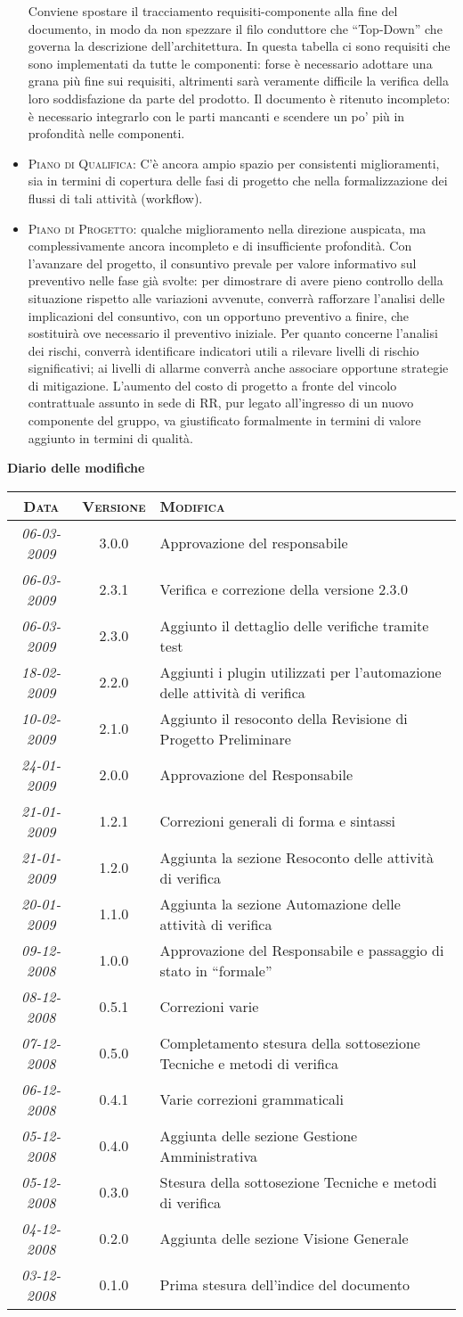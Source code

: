 \documentclass[11pt,a4paper]{article}
\newcommand{\modifiche} 
{
\newpage
\begin{center}
\textbf{Diario delle modifiche} \\
\bigskip
\begin{tabular}{|c|c|p{0.61\textwidth}|}
\hline
\textsc{Data} & \textsc{Versione} & \textsc{Modifica} \\
\hline
\hline
\textit{06-03-2009} & 3.0.0 & Approvazione del responsabile  \\
\hline
\textit{06-03-2009} & 2.3.1 & Verifica e correzione della versione 2.3.0  \\
\hline
\textit{06-03-2009} & 2.3.0 & Aggiunto il dettaglio delle verifiche tramite test   \\
\hline
\textit{18-02-2009} & 2.2.0 & Aggiunti i plugin utilizzati per l'automazione delle attività di verifica  \\
\hline
\textit{10-02-2009} & 2.1.0 & Aggiunto il resoconto della Revisione di Progetto Preliminare  \\
\hline
\textit{24-01-2009} & 2.0.0 & Approvazione del Responsabile  \\
\hline
\textit{21-01-2009} & 1.2.1 & Correzioni generali di forma e sintassi  \\
\hline
\textit{21-01-2009} & 1.2.0 & Aggiunta la sezione Resoconto delle attività di verifica  \\
\hline
\textit{20-01-2009} & 1.1.0 & Aggiunta la sezione Automazione delle attività di verifica  \\
\hline
\textit{09-12-2008} & 1.0.0 & Approvazione del Responsabile e passaggio di stato in ``formale''  \\
\hline
\textit{08-12-2008} & 0.5.1 & Correzioni varie  \\
\hline
\textit{07-12-2008} & 0.5.0 & Completamento stesura della sottosezione Tecniche e metodi di verifica  \\
\hline
\textit{06-12-2008} & 0.4.1 & Varie correzioni grammaticali  \\
\hline
\textit{05-12-2008} & 0.4.0 & Aggiunta delle sezione Gestione Amministrativa  \\
\hline
\textit{05-12-2008} & 0.3.0 & Stesura della sottosezione Tecniche e metodi di verifica  \\
\hline
\textit{04-12-2008} & 0.2.0 & Aggiunta delle sezione Visione Generale  \\
\hline
\textit{03-12-2008} & 0.1.0 & Prima stesura dell'indice del documento \\
\hline
\end{tabular}
\end{center}
}
\begin{document}
\begin{itemize}
Conviene spostare il tracciamento requisiti-componente alla fine del documento, in modo da non spezzare il filo conduttore che “Top-Down” che governa la descrizione dell'architettura. In questa tabella ci sono requisiti che sono implementati da tutte le componenti: forse è necessario adottare una grana più fine sui requisiti, altrimenti sarà veramente difficile la verifica della loro soddisfazione da parte del prodotto.
Il documento è ritenuto incompleto: è necessario integrarlo con le parti mancanti e scendere un po' più in profondità nelle componenti.
\item \textsc{Piano di Qualifica:} C'è ancora ampio spazio per consistenti miglioramenti, sia in termini di copertura delle fasi di progetto che nella formalizzazione dei flussi di tali attività (workflow).
\item \textsc{Piano di Progetto:} qualche miglioramento nella direzione auspicata, ma complessivamente ancora incompleto e di insufficiente profondità.
Con l'avanzare del progetto, il consuntivo prevale per valore informativo sul preventivo nelle fase già svolte: per dimostrare di avere pieno controllo della situazione rispetto alle variazioni avvenute, converrà rafforzare l'analisi delle implicazioni del consuntivo, con un opportuno preventivo a finire, che sostituirà ove necessario il preventivo iniziale.
Per quanto concerne l'analisi dei rischi, converrà identificare indicatori utili a rilevare livelli di rischio significativi; ai livelli di allarme converrà anche associare opportune strategie di mitigazione.
L'aumento del costo di progetto a fronte del vincolo contrattuale assunto in sede di RR, pur legato all'ingresso di un nuovo componente del gruppo, va giustificato formalmente in termini di valore aggiunto in termini di qualità.
\end{itemize}
\modifiche
\end{document}
